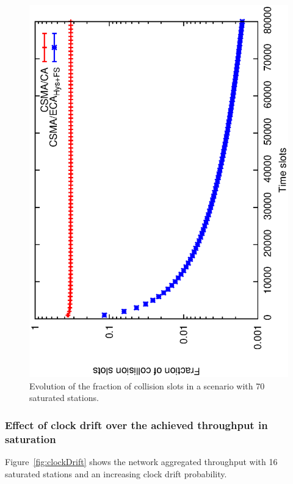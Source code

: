 	\begin{figure}[tb]
	\centering
		\includegraphics[width=0.7\linewidth,angle=-90]{figures/saturated/slots/Pc-evolution.eps}
		\caption{Evolution of the fraction of collision slots in a scenario with 70 saturated stations.}
		\label{fig:collisions-evolution}
	\end{figure}
	
	\subsubsection{Effect of clock drift over the achieved throughput in saturation}\label{performanceClockDrift}
	Figure~\ref{fig:clockDrift} shows the network aggregated throughput with 16 saturated stations and an increasing clock drift probability.
	

